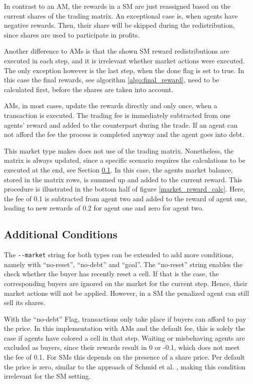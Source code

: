 In contrast to an AM, the rewards in a SM are just reassigned based on the current shares of the trading matrix. An exceptional case is, when agents have negative rewards. Then, their share will be skipped during the redistribution, since shares are used to participate in profits. 

Another difference to AMs is that the shown SM reward redistributions are executed in each step, and it is irrelevant whether market actions were executed. The only exception however is the last step, when the done flag is set to true. In this case the final rewards, see algorithm \ref{algo:final_reward}, need to be calculated first, before the shares are taken into account.

AMs, in most cases, update the rewards directly and only once, when a transaction is executed. The trading fee is immediately subtracted from one agents' reward and added to the counterpart during the trade. If an agent can not afford the fee the process is completed anyway and the agent goes into debt. 

This market type makes does not use of the trading matrix. Nonetheless, the matrix is always updated, since a specific scenario requires the calculations to be executed at the end, see Section \ref{market_conditions}. In this case, the agents market balance, stored in the matrix rows, is summed up and added to the current reward. This procedure is illustrated in the bottom half of figure \ref{market_reward_calc}. Here, the fee of 0.1 is subtracted from agent two and added to the reward of agent one, leading to new rewards of 0.2 for agent one and zero for agent two.

\subsection{Additional Conditions}\label{market_conditions}
The \verb|--market| string for both types can be extended to add more conditions, namely with ``no-reset'', ``no-debt'' and ``goal''. The ``no-reset'' string enables the check whether the buyer has recently reset a cell. If that is the case, the corresponding buyers are ignored on the market for the current step. Hence, their market actions will not be applied. However, in a SM the penalized agent can still sell its shares. 

With the ``no-debt'' Flag, transactions only take place if buyers can afford to pay the price. In this implementation with AMs and the default fee, this is solely the case if agents have colored a cell in that step. Waiting or misbehaving agents are excluded as buyers, since their rewards result in 0 or -0.1, which does not meet the fee of 0.1. For SMs this depends on the presence of a share price. Per default the price is zero, similar to the approach of Schmid et al. \cite{scbe21}, making this condition irrelevant for the SM setting.

